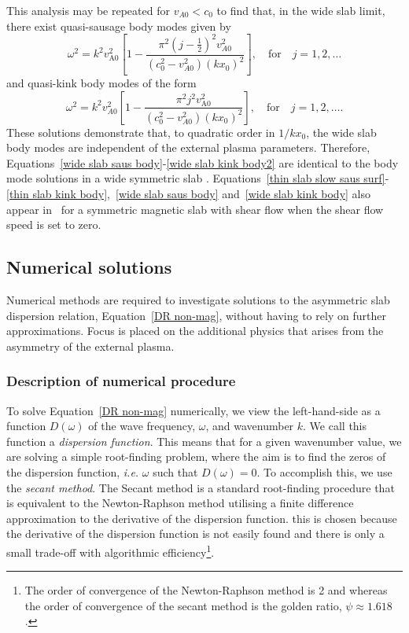 \documentclass[12pt]{../style-files/ociamthesis}
\begin{document}
This analysis may be repeated for $v_{A0} < c_0$ to find that, in the wide slab limit, there exist quasi-sausage body modes given by
\begin{equation}
\omega^2 = k^2v_\textrm{A0}^2\left[1 - \frac{\pi^2(j - \frac{1}{2})^2v_{A0}^2}{(c_0^2 - v_{A0}^2)(kx_0)^2}\right], \quad \text{for} \quad j = 1, 2, \ldots \label{wide slab saus body2}
\end{equation}
and quasi-kink body modes of the form
\begin{equation}
\omega^2 = k^2v_{A0}^2\left[1 - \frac{\pi^2j^2v_\textrm{A0}^2}{(c_0^2 - v_{A0}^2)(kx_0)^2}\right], \quad \text{for} \quad j = 1, 2, \ldots . \label{wide slab kink body2}
\end{equation}
These solutions demonstrate that, to quadratic order in $1/kx_0$, the wide slab body modes are independent of the external plasma parameters. Therefore, Equations~\eqref{wide slab saus body}-\eqref{wide slab kink body2} are identical to the body mode solutions in a wide symmetric slab \citep{rob81b}. Equations~\eqref{thin slab slow saus surf}-\eqref{thin slab kink body},~\eqref{wide slab saus body} and~\eqref{wide slab kink body} also appear in~\cite{li_etal13} for a symmetric magnetic slab with shear flow when the shear flow speed is set to zero.


\subsection{Numerical solutions} \label{sec: numerical solutions}

Numerical methods are required to investigate solutions to the asymmetric slab dispersion relation, Equation~\eqref{DR non-mag}, without having to rely on further approximations. Focus is placed on the additional physics that arises from the asymmetry of the external plasma.


\subsubsection{Description of numerical procedure}
To solve Equation~\eqref{DR non-mag} numerically, we view the left-hand-side as a function $D(\omega)$ of the wave frequency, $\omega$, and wavenumber $k$. We call this function a \textit{dispersion function}. This means that for a given wavenumber value, we are solving a simple root-finding problem, where the aim is to find the zeros of the dispersion function, \textit{i.e.} $\omega$ such that $D(\omega) = 0$. To accomplish this, we use the \textit{secant method}. The Secant method is a standard root-finding procedure that is equivalent to the Newton-Raphson method utilising a finite difference approximation to the derivative of the dispersion function. this is chosen because the derivative of the dispersion function is not easily found and there is only a small trade-off with algorithmic efficiency\footnote{The order of convergence of the Newton-Raphson method is 2 and whereas the order of convergence of the secant method is the golden ratio, $\psi \approx 1.618$.}.
\end{document}
